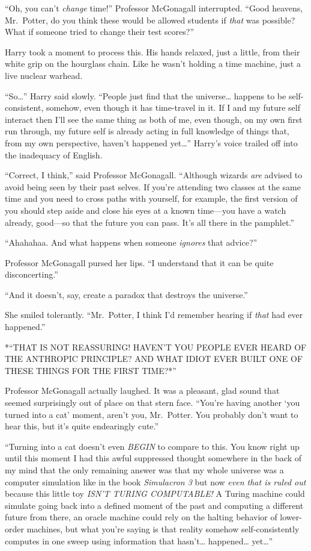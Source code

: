 ``Oh, you can't \emph{change} time!'' Professor McGonagall interrupted.
``Good heavens, Mr.~Potter, do you think these would be allowed students
if \emph{that} was possible? What if someone tried to change their test
scores?''

Harry took a moment to process this. His hands relaxed, just a little,
from their white grip on the hourglass chain. Like he wasn't holding a
time machine, just a live nuclear warhead.

``So\ldots{}'' Harry said slowly. ``People just find that the
universe\ldots{} happens to be self-consistent, somehow, even though it
has time-travel in it. If I and my future self interact then I'll see
the same thing as both of me, even though, on my own first run through,
my future self is already acting in full knowledge of things that, from
my own perspective, haven't happened yet\ldots{}'' Harry's voice trailed
off into the inadequacy of English.

``Correct, I think,'' said Professor McGonagall. ``Although wizards
\emph{are} advised to avoid being seen by their past selves. If you're
attending two classes at the same time and you need to cross paths with
yourself, for example, the first version of you should step aside and
close his eyes at a known time---you have a watch already, good---so
that the future you can pass. It's all there in the pamphlet.''

``Ahahahaa. And what happens when someone \emph{ignores} that advice?''

Professor McGonagall pursed her lips. ``I understand that it can be
quite disconcerting.''

``And it doesn't, say, create a paradox that destroys the universe.''

She smiled tolerantly. ``Mr.~Potter, I think I'd remember hearing if
\emph{that} had ever happened.''

*``THAT IS NOT REASSURING! HAVEN'T YOU PEOPLE EVER HEARD OF THE
ANTHROPIC PRINCIPLE? AND WHAT IDIOT EVER BUILT ONE OF THESE THINGS FOR
THE FIRST TIME?*''

Professor McGonagall actually laughed. It was a pleasant, glad sound
that seemed surprisingly out of place on that stern face. ``You're
having another `you turned into a cat' moment, aren't you, Mr.~Potter.
You probably don't want to hear this, but it's quite endearingly cute.''

``Turning into a cat doesn't even \emph{BEGIN} to compare to this. You
know right up until this moment I had this awful suppressed thought
somewhere in the back of my mind that the only remaining answer was that
my whole universe was a computer simulation like in the book
\emph{Simulacron 3} but now \emph{even that is ruled out} because this
little toy \emph{ISN'T TURING COMPUTABLE!} A Turing machine could
simulate going back into a defined moment of the past and computing a
different future from there, an oracle machine could rely on the halting
behavior of lower-order machines, but what you're saying is that reality
somehow self-consistently computes in one sweep using information that
hasn't\ldots{} happened\ldots{} yet\ldots{}''

